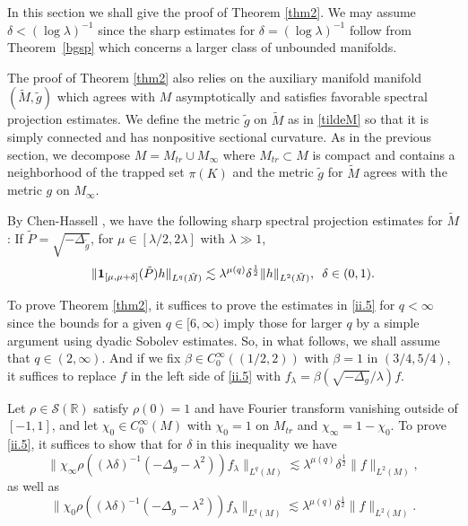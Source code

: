 \documentclass[10pt]{amsart}
\newcommand{\la}{\lambda}
\newcommand{\one}{{\bf 1}}
\newcommand{\1}{{\bf 1}}
\newcommand{\R}{{\mathbb R}}
\begin{document}






In this section we shall give the proof of Theorem \ref{thm2}.
We may assume $\delta<(\log\la)^{-1}$ since 
the sharp estimates for $\delta=(\log\la)^{-1}$ follow from Theorem~\ref{bgsp} which 
concerns a larger
class of unbounded manifolds. 

The proof of Theorem \ref{thm2} also relies on the auxiliary manifold  manifold $(\tilde M, \tilde g)$ which agrees with $M$ asymptotically and satisfies favorable spectral projection estimates. 
We define the metric $\tilde g$ on $\tilde M$ as in \eqref{tildeM} so that it is simply connected and has nonpositive sectional curvature.
As in the previous section, we decompose
$M=M_{tr}\cup M_\infty$ where $M_{tr} \subset M$ is compact and contains a neighborhood of the trapped set $\pi(K)$ and 
the metric $\tilde g$ for $\tilde M$ agrees with the metric $g$ on $M_\infty$.

By
Chen-Hassell \cite[Theorem 1.6]{ChHa}, we have the following sharp spectral projection estimates for $\tilde M$:
If $\tilde P=\sqrt{-\Delta_{\tilde g}}$, for $\mu\in [\la/2, 2\la]$ with $\la\gg1$, 
\begin{equation}\label{3.7}
\|\one_{[\mu,\mu+\delta]}(\tilde P)h\|_{L^q(\tilde M)}\lesssim \la^{\mu(q)}\delta^{\frac12}\|h\|_{L^2(\tilde M)}, \, \, \, \delta\in (0,1).
\end{equation}


To prove  Theorem \ref{thm2}, 
it suffices to prove the estimates in \eqref{ii.5} for $q<\infty$  since the bounds for a given $q\in [6,\infty)$ imply those for larger
$q$ by a simple argument using dyadic Sobolev estimates.  So, in what follows, we shall assume that $q\in (2,\infty)$. And if we fix $\beta\in C^\infty_0((1/2,2))$ with $\beta= 1$ in $(3/4,5/4)$, it suffices to replace $f$ in the left side of \eqref{ii.5} with $f_\la=\beta(\sqrt{-\Delta_g}/\la) f$.




Let $\rho\in {\mathcal S}(\R)$ satisfy $\rho(0)=1$ and have Fourier transform vanishing outside of $[-1,1]$, and let $\chi_0\in C_0^\infty(M)$ with $\chi_0= 1$ on $M_{tr}$ 
 and $\chi_\infty=1-\chi_0$.
To 
prove  \eqref{ii.5}, it suffices to show that for $\delta$ in this inequality we have
\begin{equation}\label{3.3}
\| \chi_\infty \rho((\la \delta)^{-1}(-\Delta_g-\la^2))f_\la\|_{L^q(M)}\lesssim 
    \la^{\mu(q)}\delta^{{\frac{1}{2}}}\|f\|_{L^2(M)},
\end{equation}
as well as 
\begin{equation}\label{3.4}
\| \chi_0 \rho((\la \delta)^{-1}(-\Delta_g-\la^2))f_\la\|_{L^q(M)}\lesssim\la^{\mu(q)}\delta^{\frac12} \|f\|_{L^2(M)}.
\end{equation}
\end{document}
